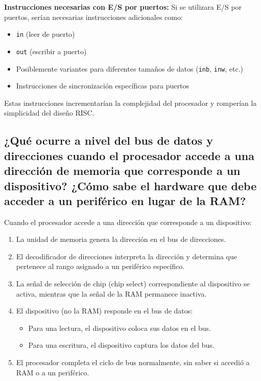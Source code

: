 \documentclass[12pt]{article}
\begin{document}
\textbf{Instrucciones necesarias con E/S por puertos:} Si se utilizara E/S por puertos, serían necesarias instrucciones adicionales como:
\begin{itemize}
	\item \texttt{in} (leer de puerto)
	\item \texttt{out} (escribir a puerto)
	\item Posiblemente variantes para diferentes tamaños de datos (\texttt{inb}, \texttt{inw}, etc.)
	\item Instrucciones de sincronización específicas para puertos
\end{itemize}

Estas instrucciones incrementarían la complejidad del procesador y romperían la simplicidad del diseño RISC.

	
\subsection{¿Qué ocurre a nivel del bus de datos y direcciones cuando el procesador accede a una dirección de memoria que corresponde a un dispositivo? ¿Cómo sabe el hardware que debe acceder a un periférico en lugar de la RAM?}

	Cuando el procesador accede a una dirección que corresponde a un dispositivo:
	
	\begin{enumerate}
		\item La unidad de memoria genera la dirección en el bus de direcciones.
		\item El decodificador de direcciones interpreta la dirección y determina que pertenece al rango asignado a un periférico específico.
		\item La señal de selección de chip (chip select) correspondiente al dispositivo se activa, mientras que la señal de la RAM permanece inactiva.
		\item El dispositivo (no la RAM) responde en el bus de datos:
		\begin{itemize}
			\item Para una lectura, el dispositivo coloca sus datos en el bus.
			\item Para una escritura, el dispositivo captura los datos del bus.
		\end{itemize}
		\item El procesador completa el ciclo de bus normalmente, sin saber si accedió a RAM o a un periférico.
	\end{enumerate}
	
\end{document}
